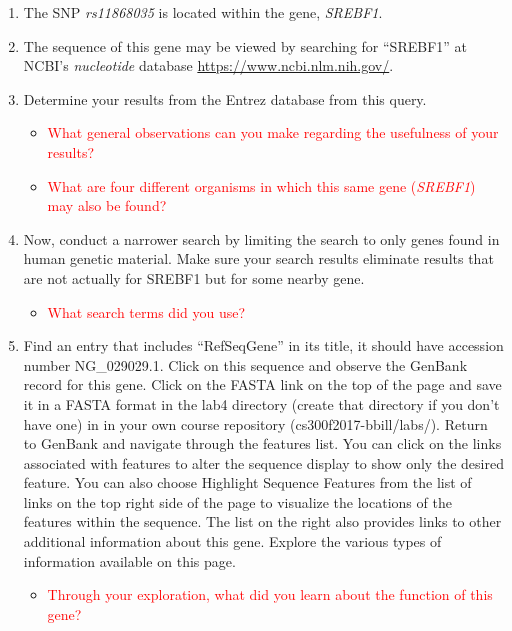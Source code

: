 \begin{enumerate}
	\item The SNP \emph{rs11868035} is located within the gene, \emph{SREBF1}. 
	
	\item The sequence of this gene may be viewed by searching for ``SREBF1'' at NCBI's \emph{nucleotide} database \url{https://www.ncbi.nlm.nih.gov/}. %
	
	\item Determine your results from the Entrez database from this query.
	\begin{itemize}
		\item \textcolor{red}{What general observations can you make regarding the usefulness of your results?}
		\item \textcolor{red}{What are four different organisms in which this same gene (\emph{SREBF1}) may also be found?}
	\end{itemize}
	
	\item Now, conduct a narrower search by limiting the search to only genes found in human genetic material. Make sure your search results eliminate results that are not actually for SREBF1 but for some nearby gene. 
	\begin{itemize}
		\item  \textcolor{red}{What search terms did you use?}
	\end{itemize}
	
	\item Find an entry that includes ``RefSeqGene'' in its title, it should have accession number NG\_029029.1. Click on this sequence and observe the GenBank record for this gene. Click on the FASTA link on the top of the page and save it in a FASTA format in the lab4 directory (create that directory if you don't have one) in in your own course repository (cs300f2017-bbill/labs/). Return to GenBank and navigate through the features list. You can click on the links associated with features to alter the sequence display to show only the desired feature. You can also choose Highlight Sequence Features from the list of links on the top right side of the page to visualize the locations of the features within the sequence. The list on the right also provides links to other additional information about this gene. Explore the various types of information available on this page. 
	\begin{itemize}
		\item \textcolor{red}{Through your exploration, what did you learn about the function of this gene?}
	\end{itemize}
\end{enumerate}


